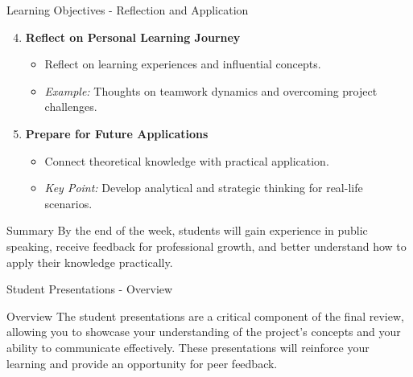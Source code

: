 \documentclass[aspectratio=169]{beamer}
\begin{document}
\begin{frame}[fragile]{Learning Objectives - Reflection and Application}
  \begin{enumerate}
    \setcounter{enumi}{3}
    \item \textbf{Reflect on Personal Learning Journey}
      \begin{itemize}
        \item Reflect on learning experiences and influential concepts.
        \item \textit{Example:} Thoughts on teamwork dynamics and overcoming project challenges.
      \end{itemize}

    \item \textbf{Prepare for Future Applications}
      \begin{itemize}
        \item Connect theoretical knowledge with practical application.
        \item \textit{Key Point:} Develop analytical and strategic thinking for real-life scenarios.
      \end{itemize}
  \end{enumerate}
  
  \begin{block}{Summary}
    By the end of the week, students will gain experience in public speaking, receive feedback for professional growth, and better understand how to apply their knowledge practically.
  \end{block}
\end{frame}

\begin{frame}[fragile]{Student Presentations - Overview}
    \begin{block}{Overview}
        The student presentations are a critical component of the final review, allowing you to showcase your understanding of the project's concepts and your ability to communicate effectively. These presentations will reinforce your learning and provide an opportunity for peer feedback.
    \end{block}
\end{frame}
\end{document}
